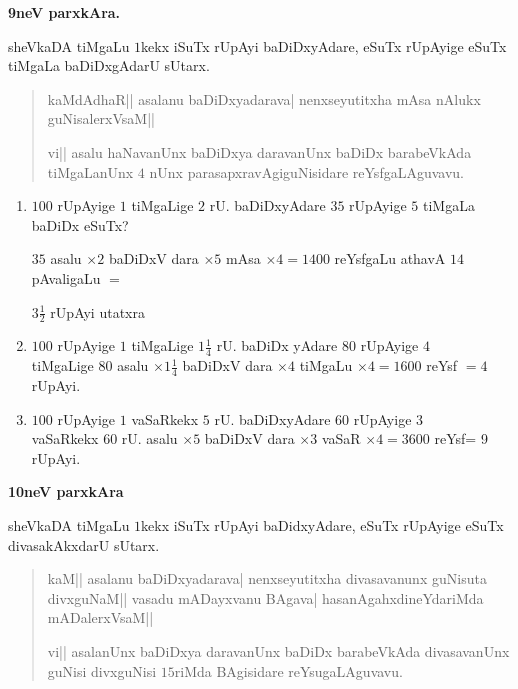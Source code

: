 \medskip

\begin{center}
{\large\bf 9neV parxkAra.}
\end{center}

sheVkaDA tiMgaLu $1$kekx iSuTx rUpAyi baDiDxyAdare, eSuTx rUpAyige eSuTx tiMgaLa baDiDxgAdarU sUtarx.

\begin{verse}
kaMdAdhaR|| asalanu baDiDxyadarava| nenxseyutitxha mAsa nAlukx guNisalerxVsaM||

vi|| asalu haNavanUnx baDiDxya daravanUnx baDiDx barabeVkAda tiMgaLanUnx $4$ nUnx parasapxravAgi\break guNisidare reYsfgaLAguvavu.
\end{verse}

\begin{enumerate}[\rm (1)]
\itemsep=0pt
\item $100$ rUpAyige $1$ tiMgaLige $2$ rU. baDiDxyAdare $35$ rUpAyige $5$ tiMgaLa baDiDx eSuTx?

$35$ asalu $\times 2$ baDiDxV dara $\times 5$ mAsa $\times 4 = 1400$ reYsfgaLu athavA $14$ pAvaligaLu $=$

$3\frac{1}{2}$ rUpAyi utatxra

\item $100$ rUpAyige $1$ tiMgaLige $1\frac{1}{4}$ rU. baDiDx yAdare $80$ rUpAyige $4$\\
tiMgaLige $80$ asalu $\times 1\frac{1}{4}$ baDiDxV dara $\times 4$ tiMgaLu $\times 4=1600$
reYsf $= 4$ rUpAyi.

\item $100$ rUpAyige $1$ vaSaRkekx $5$ rU. baDiDxyAdare $60$ rUpAyige $3$\\ \quad vaSaRkekx $60$ rU. asalu $\times 5$ baDiDxV dara $\times 3$ vaSaR $\times 4= 3600$ reYsf= 9 rUpAyi.
\end{enumerate}

\medskip

\begin{center}
{\large\bf 10neV parxkAra}
\end{center}

sheVkaDA tiMgaLu $1$kekx iSuTx rUpAyi baDidxyAdare, eSuTx rUpAyige eSuTx divasakAkxdarU sUtarx.

\begin{verse}
kaM|| asalanu baDiDxyadarava| nenxseyutitxha divasavanunx guNisuta divxguNaM|| vasadu mADayxvanu BAgava| hasanAgahxdineYdariMda mADalerxVsaM||

vi|| asalanUnx  baDiDxya daravanUnx baDiDx barabeVkAda divasavanUnx guNisi divxguNisi $15$riMda BAgisi\-dare reYsugaLAguvavu.
\end{verse}

